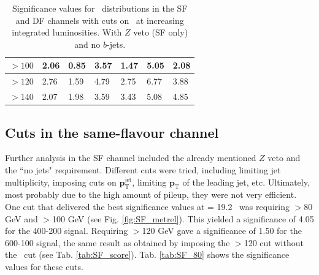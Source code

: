 \begin{table}[H]
\begin{tabular}{|l|llllll}
$>100$   & \multicolumn{1}{l|}{2.06}               & \multicolumn{1}{l|}{0.85}               & \multicolumn{1}{l|}{3.57}               & \multicolumn{1}{l|}{1.47}               & \multicolumn{1}{l|}{5.05}               & \multicolumn{1}{l|}{2.08}               \\ \hline
$>120$    & \multicolumn{1}{l|}{2.76}               & \multicolumn{1}{l|}{1.59}               & \multicolumn{1}{l|}{4.79}               & \multicolumn{1}{l|}{2.75}               & \multicolumn{1}{l|}{6.77}               & \multicolumn{1}{l|}{3.88}               \\ \hline
$>140$    & \multicolumn{1}{l|}{2.07}               & \multicolumn{1}{l|}{1.98}               & \multicolumn{1}{l|}{3.59}               & \multicolumn{1}{l|}{3.43}               & \multicolumn{1}{l|}{5.08}               & \multicolumn{1}{l|}{4.85}               \\ \hline
\end{tabular}
\caption{Significance values for \mttwo \, distributions in the SF and DF channels with cuts on \mttwo \, at increasing integrated luminosities. With $Z$ veto (SF only) and no $b$-jets. }
\label{tab:SF_score_0bjets}
\end{table}
\newpage
\subsection{Cuts in the same-flavour channel}
Further analysis in the SF channel included the already mentioned $Z$ veto and the ``no jets" requirement. Different cuts were tried, including limiting jet multiplicity, imposing cuts on 
$\mathbf{p}^{\text{jet}}_{\text{T}}$, limiting $\mathbf{p}_{\text{T}}$ of the leading jet, etc. Ultimately, most probably due to the high amount of pileup, they were not very efficient. One cut that delivered the best significance values at \lumi= 19.2 \invfb \, was requiring \metrel$>$80 GeV and \mttwo$>$100 GeV (see Fig. \ref{fig:SF_metrel}). This yielded a significance of 4.05 for the 400-200 signal. Requiring \mttwo$>$120 GeV gave a significance of 1.50 for the 600-100 signal, the same result as obtained by imposing the \mttwo$>$120 cut without the \metrel \, cut (see Tab. \ref{tab:SF_score}). Tab. \ref{tab:SF_80} shows the significance values for these cuts.

